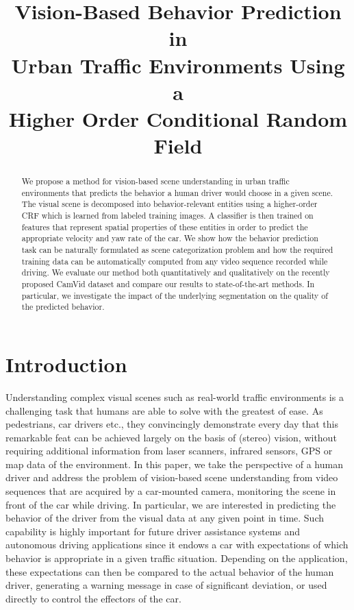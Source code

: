 \documentclass{bmvc2k}
\title{Vision-Based Behavior Prediction in \\ Urban Traffic Environments Using a \\ Higher Order Conditional Random Field}
\begin{document}
\maketitle

\begin{abstract}
We propose a method for vision-based scene understanding in urban
traffic environments that predicts the behavior a human driver would
choose in a given scene. The visual scene is decomposed into
behavior-relevant entities using a higher-order CRF which is learned
from labeled training images. A classifier is then trained on features
that represent spatial properties of these entities in order to
predict the appropriate velocity and yaw rate of the car. We show how
the behavior prediction task can be naturally formulated as scene
categorization problem and how the required training data can be
automatically computed from any video sequence recorded while
driving. We evaluate our method both quantitatively and qualitatively
on the recently proposed CamVid dataset and compare our results to
state-of-the-art methods. In particular, we investigate the impact of
the underlying segmentation on the quality of the predicted behavior.
\end{abstract}

\section{Introduction}
\label{sec:intro}

Understanding complex visual scenes such as real-world traffic environments is a challenging task that humans are able to solve with the greatest of ease. As pedestrians, car drivers etc., they convincingly demonstrate every day that this remarkable feat can be achieved largely on the basis of (stereo) vision, without requiring additional information from laser scanners, infrared sensors, GPS or map data of the environment. In this paper, we take the perspective of a human driver and address the problem of vision-based scene understanding from video sequences that are acquired by a car-mounted camera, monitoring the scene in front of the car while driving. In particular, we are interested in predicting the behavior of the driver from the visual data at any given point in time. Such capability is highly important for future driver assistance systems and autonomous driving applications since it endows a car with expectations of which behavior is appropriate in a given traffic situation. Depending on the application, these expectations can then be compared to the actual behavior of the human driver, generating a warning message in case of significant deviation, or used directly to control the effectors of the car. 
\end{document}
